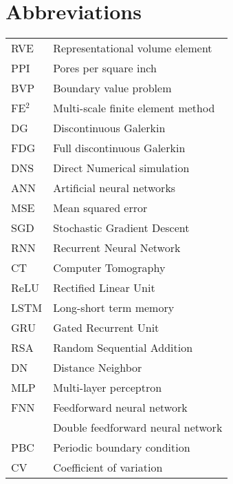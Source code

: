 \chapter*{Abbreviations}
\begin{longtable*}{l l}
		RVE & Representational volume element \\
		PPI & Pores per square inch \\
		BVP & Boundary value problem \\
		FE$^2$ & Multi-scale finite element method \\
		DG & Discontinuous Galerkin \\
		FDG & Full discontinuous Galerkin \\
		DNS & Direct Numerical simulation \\
		ANN & Artificial neural networks \\
		MSE & Mean squared error \\
		SGD & Stochastic Gradient Descent \\
		RNN & Recurrent Neural Network \\
		CT & Computer Tomography \\
		ReLU & Rectified Linear Unit \\
		LSTM & Long-short term memory \\
		GRU & Gated Recurrent Unit \\
		RSA & Random Sequential Addition \\
		DN & Distance Neighbor \\
		MLP & Multi-layer perceptron \\
		FNN & Feedforward neural network \\
		\fnn & Double feedforward neural network \\
		PBC & Periodic boundary condition \\
		CV & Coefficient of variation
\end{longtable*}
